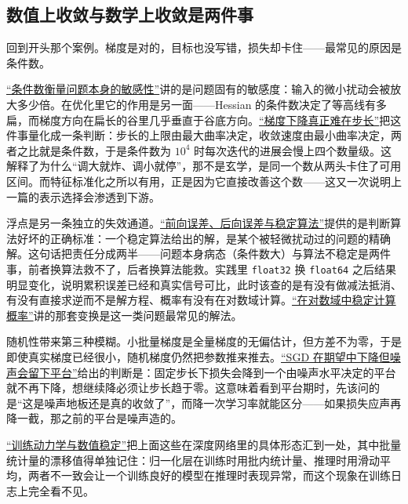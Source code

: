\subsection{数值上收敛与数学上收敛是两件事}

回到开头那个案例。梯度是对的，目标也没写错，损失却卡住——最常见的原因是条件数。

\hyperref[sec:08-Numerical-Analysis/01-Floating-Point-and-Error/03]{``条件数衡量问题本身的敏感性''}讲的是问题固有的敏感度：输入的微小扰动会被放大多少倍。在优化里它的作用是另一面——Hessian 的条件数决定了等高线有多扁，而梯度方向在扁长的谷里几乎垂直于谷底方向。\hyperref[sec:09-Convex-Optimization/06-Optimization-Algorithms/01]{``梯度下降真正难在步长''}把这件事量化成一条判断：步长的上限由最大曲率决定，收敛速度由最小曲率决定，两者之比就是条件数，于是条件数为 \(10^4\) 时每次迭代的进展会慢上四个数量级。这解释了为什么``调大就炸、调小就停''，那不是玄学，是同一个数从两头卡住了可用区间。而特征标准化之所以有用，正是因为它直接改善这个数——这又一次说明上一篇的表示选择会渗透到下游。

浮点是另一条独立的失效通道。\hyperref[sec:08-Numerical-Analysis/01-Floating-Point-and-Error/04]{``前向误差、后向误差与稳定算法''}提供的是判断算法好坏的正确标准：一个稳定算法给出的解，是某个被轻微扰动过的问题的精确解。这句话把责任分成两半——问题本身病态（条件数大）与算法不稳定是两件事，前者换算法救不了，后者换算法能救。实践里 \texttt{float32} 换 \texttt{float64} 之后结果明显变化，说明累积误差已经和真实信号可比，此时该查的是有没有做减法抵消、有没有直接求逆而不是解方程、概率有没有在对数域计算。\hyperref[sec:08-Numerical-Analysis/07-Numerical-Methods-for-ML/01]{``在对数域中稳定计算概率''}讲的那套变换是这一类问题最常见的解法。

随机性带来第三种模糊。小批量梯度是全量梯度的无偏估计，但方差不为零，于是即使真实梯度已经很小，随机梯度仍然把参数推来推去。\hyperref[sec:09-Convex-Optimization/08-Nonconvex-and-Stochastic-Optimization/04]{``SGD 在期望中下降但噪声会留下平台''}给出的判断是：固定步长下损失会降到一个由噪声水平决定的平台就不再下降，想继续降必须让步长趋于零。这意味着看到平台期时，先该问的是``这是噪声地板还是真的收敛了''，而降一次学习率就能区分——如果损失应声再降一截，那之前的平台是噪声造的。

\hyperref[sec:14-Deep-Learning/03-Optimization-and-Training/01]{``训练动力学与数值稳定''}把上面这些在深度网络里的具体形态汇到一处，其中批量统计量的漂移值得单独记住：归一化层在训练时用批内统计量、推理时用滑动平均，两者不一致会让一个训练良好的模型在推理时表现异常，而这个现象在训练日志上完全看不见。

